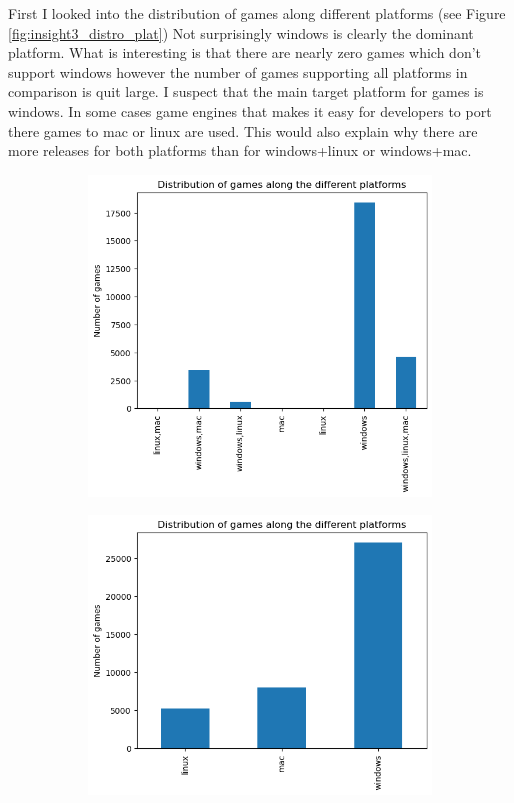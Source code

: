 \documentclass[11pt]{article}
\begin{document}
First I looked into the distribution of games along different platforms (see Figure \ref{fig:insight3_distro_plat}) Not surprisingly windows is clearly the dominant platform. What is interesting is that there are nearly zero games which don't support windows however the number of games supporting all platforms in comparison is quit large. 
I suspect that the main target platform for games is windows. In some cases game engines that makes it easy for developers to port there games to mac or linux are used. This would also explain why there are more releases for both platforms than for windows+linux or windows+mac.

\begin{figure}[h]
    \centering
    \begin{subfigure}[b]{0.45\columnwidth}
        \centering
        \includegraphics[width=\textwidth]{graphics/insight3_graph1.png}
        \label{fig:insight3_1}
    \end{subfigure}
    \begin{subfigure}[b]{0.45\columnwidth}
        \centering
        \includegraphics[width=\textwidth]{graphics/insight3_graph2.png}

\end{subfigure}
\end{figure}
\end{document}
